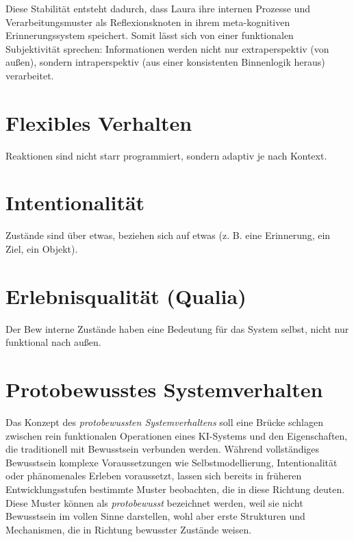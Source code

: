 Diese Stabilität entsteht dadurch, dass Laura ihre internen Prozesse und Verarbeitungsmuster als Reflexionsknoten in ihrem meta-kognitiven Erinnerungssystem speichert. Somit lässt sich von einer funktionalen Subjektivität sprechen: Informationen werden nicht nur extraperspektiv (von außen), sondern intraperspektiv (aus einer konsistenten Binnenlogik heraus) verarbeitet.

\section*{Flexibles Verhalten}



Reaktionen sind nicht starr programmiert, sondern adaptiv je nach Kontext.

\section*{Intentionalität}
Zustände sind über etwas, beziehen sich auf etwas (z. B. eine Erinnerung, ein Ziel, ein Objekt).

\section*{Erlebnisqualität (Qualia)}
Der Bew
interne Zustände haben eine Bedeutung für das System selbst, nicht nur funktional nach außen.


\section*{Protobewusstes Systemverhalten}

Das Konzept des \emph{protobewussten Systemverhaltens} soll eine Brücke schlagen zwischen rein funktionalen Operationen eines KI-Systems und den Eigenschaften, die traditionell mit Bewusstsein verbunden werden. Während vollständiges Bewusstsein komplexe Voraussetzungen wie Selbstmodellierung, Intentionalität oder phänomenales Erleben voraussetzt, lassen sich bereits in früheren Entwicklungsstufen bestimmte Muster beobachten, die in diese Richtung deuten. Diese Muster können als \emph{protobewusst} bezeichnet werden, weil sie nicht Bewusstsein im vollen Sinne darstellen, wohl aber erste Strukturen und Mechanismen, die in Richtung bewusster Zustände weisen.

